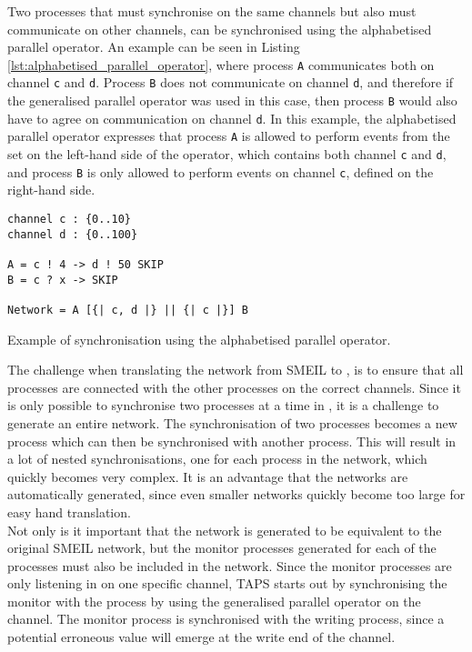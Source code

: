 Two processes that must synchronise on the same channels but also must communicate on other channels, can be synchronised using the alphabetised parallel operator. An example can be seen in Listing \ref{lst:alphabetised_parallel_operator}, where process \texttt{A} communicates both on channel \texttt{c} and \texttt{d}. Process \texttt{B} does not communicate on channel \texttt{d}, and therefore if the generalised parallel operator was used in this case, then process \texttt{B} would also have to agree on communication on channel \texttt{d}. In this example, the alphabetised parallel operator expresses that process \texttt{A} is allowed to perform events from the set on the left-hand side of the operator, which contains both channel \texttt{c} and \texttt{d}, and process \texttt{B} is only allowed to perform events on channel \texttt{c}, defined on the right-hand side.
\begin{listing}
\begin{verbatim}
channel c : {0..10}
channel d : {0..100}

A = c ! 4 -> d ! 50 SKIP
B = c ? x -> SKIP

Network = A [{| c, d |} || {| c |}] B
\end{verbatim}
\caption{Example of synchronisation using the alphabetised parallel operator.}
\label{lst:alphabetised_parallel_operator}
\end{listing}

The challenge when translating the network from SMEIL to \cspm{}, is to ensure that all processes are connected with the other processes on the correct channels.
Since it is only possible to synchronise two processes at a time in \cspm{}, it is a challenge to generate an entire network. The synchronisation of two processes becomes a new process which can then be synchronised with another process. This will result in a lot of nested synchronisations, one for each process in the network, which quickly becomes very complex. It is an advantage that the \cspm{} networks are automatically generated, since even smaller networks quickly become too large for easy hand translation.\\

Not only is it important that the network is generated to be equivalent to the original SMEIL network, but the monitor processes generated for each of the \cspm{} processes must also be included in the network. Since the monitor processes are only listening in on one specific channel, TAPS starts out by synchronising the monitor with the process by using the generalised parallel operator on the channel. The monitor process is synchronised with the writing process, since a potential erroneous value will emerge at the write end of the channel.\\

